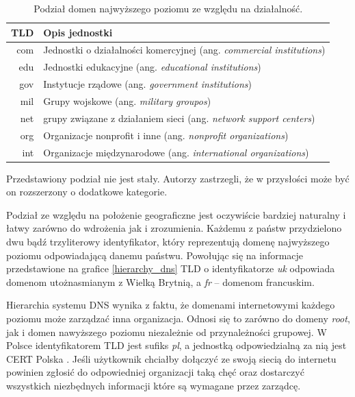 \begin{table}[]
	\centering
	\caption{Podział domen najwyższego poziomu ze względu na działalność.}
	\label{my-label}
	\begin{tabular}{|r|p{10.5cm}|}
		\hline
		\textbf{TLD} & \textbf{Opis jednostki} \\
		\hline\hline
		com & Jednostki o działalności komercyjnej (ang. \textit{commercial institutions}) \\
		\hline
		edu & Jednostki edukacyjne (ang. \textit{educational institutions})\\
		\hline
		gov & Instytucje rządowe (ang. \textit{government institutions}) \\
		\hline
		mil & Grupy wojskowe (ang. \textit{military groupos}) \\
		\hline
		net & grupy związane z działaniem sieci (ang. \textit{network support centers}) \\
		\hline
		org & Organizacje nonprofit i inne (ang. \textit{nonprofit organizations}) \\
		\hline
		int & Organizacje międzynarodowe (ang. \textit{international organizations}) \\
		\hline 
	\end{tabular}
\end{table}

Przedstawiony podział nie jest stały. Autorzy zastrzegli, że w przysłości może być on rozszerzony o dodatkowe kategorie.

Podział ze względu na położenie geograficzne jest oczywiście bardziej naturalny i łatwy zarówno do wdrożenia jak i zrozumienia. Każdemu z państw przydzielono dwu bądź trzyliterowy identyfikator, który reprezentują domenę najwyższego poziomu odpowiadającą danemu państwu. Powołując się na informacje przedstawione na grafice \ref{hierarchy_dns} TLD o identyfikatorze \textit{uk} odpowiada domenom utożnasmianym z Wielką Brytnią, a \textit{fr} -- domenom francuskim.

Hierarchia systemu DNS wynika z faktu, że domenami internetowymi każdego poziomu może zarządzać inna organizacja. Odnosi się to zarówno do domeny \textit{root}, jak i domen nawyższego poziomu niezależnie od przynależności grupowej. W Polsce identyfikatorem TLD jest sufiks \textit{pl}, a jednostką odpowiedzialną za nią jest CERT Polska \cite{cert}. Jeśli użytkownik chciałby dołączyć ze swoją siecią do internetu powinien zgłosić do odpowiedniej organizacji taką chęć oraz dostarczyć wszystkich niezbędnych informacji które są wymagane przez zarządcę. 

